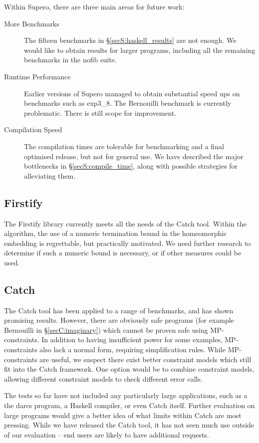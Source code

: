 Within Supero, there are three main areas for future work:

\begin{description}
\item[More Benchmarks] The fifteen benchmarks in \S\ref{secS:haskell_results} are not enough. We would like to obtain results for larger programs, including all the remaining benchmarks in the nofib suite.
\item[Runtime Performance] Earlier versions of Supero \cite{me:supero_ifl} managed to obtain substantial speed ups on benchmarks such as exp3\_8. The Bernouilli benchmark is currently problematic. There is still scope for improvement.
\item[Compilation Speed] The compilation times are tolerable for benchmarking and a final optimised release, but not for general use. We have described the major bottlenecks in \S\ref{secS:compile_time}, along with possible strategies for alleviating them.
\end{description}

\subsection{Firstify}

The Firstify library currently meets all the needs of the Catch tool. Within the algorithm, the use of a numeric termination bound in the homeomorphic embedding is regrettable, but practically motivated. We need further research to determine if such a numeric bound is necessary, or if other measures could be used.

\subsection{Catch}

The Catch tool has been applied to a range of benchmarks, and has shown promising results. However, there are obviously safe programs (for example Bernouilli in \S\ref{secC:imaginary}) which cannot be proven safe using MP-constraints. In addition to having insufficient power for some examples, MP-constraints also lack a normal form, requiring simplification rules. While MP-constraints are useful, we suspect there exist better constraint models which still fit into the Catch framework. One option would be to combine constraint models, allowing different constraint models to check different error calls.

The tests so far have not included any particularly large applications, such as a the darcs program, a Haskell compiler, or even Catch itself. Further evaluation on large programs would give a better idea of what limits within Catch are most pressing. While we have released the Catch tool, it has not seen much use outside of our evaluation -- end users are likely to have additional requests.

